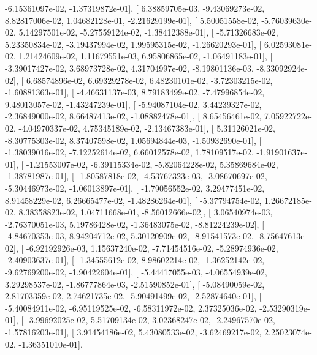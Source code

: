 \documentclass{article}
\begin{document}
         -6.15361097e-02,  -1.37319872e-01],
       [  6.38859705e-03,  -9.43069273e-02,   8.82817006e-02,
          1.04682128e-01,  -2.21629199e-01],
       [  5.50051558e-02,  -5.76039630e-02,   5.14297501e-02,
         -5.27559124e-02,  -1.38412388e-01],
       [ -5.71326683e-02,   5.23350834e-02,  -3.19437994e-02,
          1.99595315e-02,  -1.26620293e-01],
       [  6.02593081e-02,   1.21424609e-02,   1.11679551e-03,
          6.95806865e-02,  -1.06491183e-01],
       [ -3.39017427e-02,   3.68973728e-02,   4.31704997e-02,
         -8.19801136e-03,  -8.33092924e-02],
       [  6.68574896e-02,   6.69329278e-02,   6.48230101e-02,
         -3.72303215e-02,  -1.60881363e-01],
       [ -4.46631137e-03,   8.79183499e-02,  -7.47996854e-02,
          9.48013057e-02,  -1.43247239e-01],
       [ -5.94087104e-02,   3.44239327e-02,  -2.36849000e-02,
          8.66487413e-02,  -1.08882478e-01],
       [  8.65456461e-02,   7.05922722e-02,  -4.04970337e-02,
          4.75345189e-02,  -2.13467383e-01],
       [  5.31126021e-02,  -8.30775303e-02,   8.37407598e-02,
          1.05694844e-03,  -1.50932690e-01],
       [ -1.38039016e-02,  -7.12252614e-02,   6.66012578e-02,
          1.78109517e-02,  -1.91901637e-01],
       [ -1.21553007e-02,  -6.39115334e-02,  -5.82064228e-02,
          5.35869684e-02,  -1.38781987e-01],
       [ -1.80587818e-02,  -4.53767323e-03,  -3.08670697e-02,
         -5.30446973e-02,  -1.06013897e-01],
       [ -1.79056552e-02,   3.29477451e-02,   8.91458229e-02,
          6.26665477e-02,  -1.48286264e-01],
       [ -5.37794754e-02,   1.26672185e-02,   8.38358823e-02,
          1.04711668e-01,  -8.56012666e-02],
       [  3.06540974e-03,  -2.76370051e-03,   5.19786428e-02,
         -1.36483075e-02,  -8.81224239e-02],
       [ -4.84670353e-03,   8.94204712e-02,   5.30120909e-02,
         -8.91541573e-02,  -8.75647613e-02],
       [ -6.92192926e-03,   1.15637240e-02,  -7.71454516e-02,
         -5.28974936e-02,  -2.40903637e-01],
       [ -1.34555612e-02,   8.98602214e-02,  -1.36252142e-02,
         -9.62769200e-02,  -1.90422604e-01],
       [ -5.44417055e-03,  -4.06554939e-02,   3.29298537e-02,
         -1.86777864e-03,  -2.51590852e-01],
       [ -5.08490059e-02,   2.81703359e-02,   2.74621735e-02,
         -5.90491499e-02,  -2.52874640e-01],
       [ -5.40084911e-02,  -6.95119525e-02,  -6.58311972e-02,
          2.37325036e-02,  -2.53290319e-01],
       [ -3.99692025e-02,   5.51709134e-02,   3.02368247e-02,
         -2.24967570e-02,  -1.57816203e-01],
       [  3.91454186e-02,   5.43080533e-02,  -3.62469217e-02,
          2.25023074e-02,  -1.36351010e-01],
\end{document}
